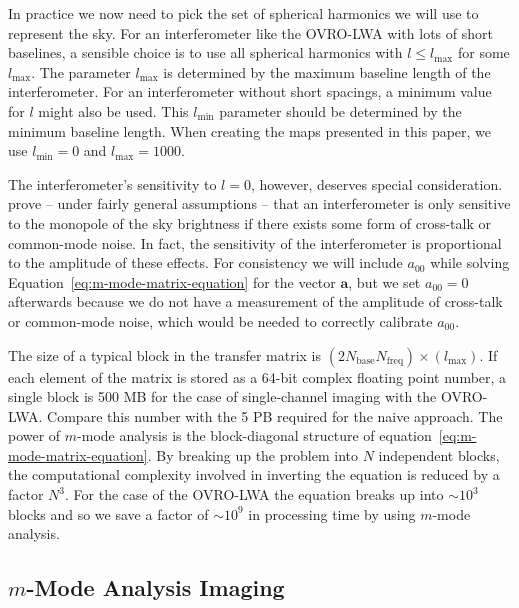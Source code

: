 \documentclass[twocolumn]{aastex6}
\renewcommand{\b}{\pmb}
\begin{document}
In practice we now need to pick the set of spherical harmonics we will use to represent the sky. For
an interferometer like the OVRO-LWA with lots of short baselines, a sensible choice is to use all
spherical harmonics with $l\le l_\text{max}$ for some $l_\text{max}$. The parameter $l_\text{max}$
is determined by the maximum baseline length of the interferometer.  For an interferometer without
short spacings, a minimum value for $l$ might also be used. This $l_\text{min}$ parameter should be
determined by the minimum baseline length.  When creating the maps presented in this paper, we use
$l_\text{min} = 0$ and $l_\text{max} = 1000$.

The interferometer's sensitivity to $l=0$, however, deserves special consideration.
\citet{2016ApJ...826..116V} prove -- under fairly general assumptions -- that an interferometer is
only sensitive to the monopole of the sky brightness if there exists some form of cross-talk or
common-mode noise. In fact, the sensitivity of the interferometer is proportional to the amplitude
of these effects. For consistency we will include $a_{00}$ while solving
Equation~\ref{eq:m-mode-matrix-equation} for the vector $\b a$, but we set $a_{00} = 0$ afterwards
because we do not have a measurement of the amplitude of cross-talk or common-mode noise, which
would be needed to correctly calibrate $a_{00}$.

The size of a typical block in the transfer matrix is
$(2N_\text{base}N_\text{freq})\times(l_\text{max})$. If each element of the matrix is stored as a
64-bit complex floating point number, a single block is 500 MB for the case of single-channel
imaging with the OVRO-LWA. Compare this number with the 5 PB required for the naive approach.  The
power of $m$-mode analysis is the block-diagonal structure of
equation~\ref{eq:m-mode-matrix-equation}.  By breaking up the problem into $N$ independent blocks,
the computational complexity involved in inverting the equation is reduced by a factor $N^3$. For
the case of the OVRO-LWA the equation breaks up into $\sim10^3$ blocks and so we save a factor of
$\sim10^9$ in processing time by using $m$-mode analysis.

\subsection{$m$-Mode Analysis Imaging}
\end{document}
